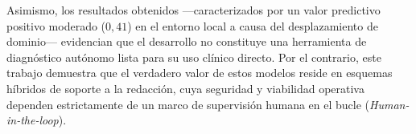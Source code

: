 \documentclass[../tesis.tex]{subfiles}
\begin{document}
Asimismo, los resultados obtenidos —caracterizados por un valor predictivo positivo moderado ($0{,}41$) en el entorno local a causa del desplazamiento de dominio— evidencian que el desarrollo no constituye una herramienta de diagnóstico autónomo lista para su uso clínico directo. Por el contrario, este trabajo demuestra que el verdadero valor de estos modelos reside en esquemas híbridos de soporte a la redacción, cuya seguridad y viabilidad operativa dependen estrictamente de un marco de supervisión humana en el bucle (\textit{Human-in-the-loop}).
\end{document}
